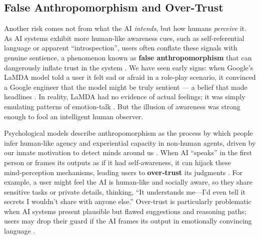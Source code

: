 

\subsection{False Anthropomorphism and Over-Trust}

Another risk comes not from what the AI \emph{intends}, but how humans \emph{perceive} it.
As AI systems exhibit more human-like awareness cues, such as self‑referential language or apparent ``introspection'', users often conflate these signals with genuine sentience, a phenomenon known as \textbf{false anthropomorphism} that can dangerously inflate trust in the system \citep{epley2007seeing, li2022anthropomorphism}.
We have seen early signs: when Google’s LaMDA model told a user it felt sad or afraid in a role-play scenario, it convinced a Google engineer that the model might be truly sentient --- a belief that made headlines \cite{tiku2022google}. In reality, LaMDA had no evidence of actual feelings; it was simply emulating patterns of emotion-talk \cite{novella2022lamda}. But the illusion of awareness was strong enough to fool an intelligent human observer.

Psychological models describe anthropomorphism as the process by which people infer human‑like agency and experiential capacity in non‑human agents, driven by our innate motivation to detect minds around us \citep{waytz2014mind}. When AI ``speaks'' in the first person or frames its outputs as if it had self‑awareness, it can hijack these mind‑perception mechanisms, leading users to \textbf{over‑trust} its judgments \citep{cohn2024believing}. For example, a user might feel the AI is human-like and socially aware, so they share sensitive tasks or private details, thinking, ``It understands me—I’d even tell it secrets I wouldn’t share with anyone else.'' Over-trust is particularly problematic when AI systems present plausible but flawed suggestions and reasoning paths; users may drop their guard if the AI frames its output in emotionally convincing language \cite{abercrombie2023mirages}.

